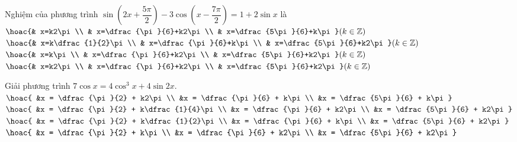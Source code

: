 \begin{ex}%
	Nghiệm của  phương trình 
	$\sin\left(2x + \dfrac{5\pi}{2}\right) - 3\cos\left(x - \dfrac{7\pi}{2}\right) = 1 + 2\sin x$ là 
	\choice
	{$ \hoac{& x=k2\pi\\ & x=\dfrac{\pi}{6}+k2\pi\\ & x=\dfrac{5\pi}{6}+k\pi} (k\in \mathbb{Z}) $}
	{$ \hoac{& x=k\dfrac{1}{2}\pi\\ & x=\dfrac{\pi}{6}+k\pi\\ & x=\dfrac{5\pi}{6}+k2\pi} (k\in \mathbb{Z}) $}
	{\True $ \hoac{& x=k\pi\\ & x=\dfrac{\pi}{6}+k2\pi\\ & x=\dfrac{5\pi}{6}+k2\pi} (k\in \mathbb{Z}) $}
	{$ \hoac{& x=k2\pi\\ & x=\dfrac{\pi}{6}+k2\pi\\ & x=\dfrac{5\pi}{6}+k2\pi} (k\in \mathbb{Z}) $}
\end{ex}
\begin{ex}%
	Giải phương trình $7\cos x = 4\cos^3x + 4\sin 2x$.
	\choice
	{$\hoac{
			&x = \dfrac{\pi}{2} + k2\pi \\
			&x = \dfrac{\pi}{6} + k\pi\\
			&x = \dfrac{5\pi}{6} + k\pi 
		}$}
	{$\hoac{
			&x = \dfrac{\pi}{2} + k\dfrac{1}{4}\pi \\
			&x = \dfrac{\pi}{6} + k2\pi\\
			&x = \dfrac{5\pi}{6} + k2\pi 
		}$}
	{$\hoac{
			&x = \dfrac{\pi}{2} + k\dfrac{1}{2}\pi \\
			&x = \dfrac{\pi}{6} + k\pi\\
			&x = \dfrac{5\pi}{6} + k2\pi 
		}$} 
	{\True $\hoac{
			&x = \dfrac{\pi}{2} + k\pi \\
			&x = \dfrac{\pi}{6} + k2\pi\\
			&x = \dfrac{5\pi}{6} + k2\pi	 
		}$}
\end{ex}




